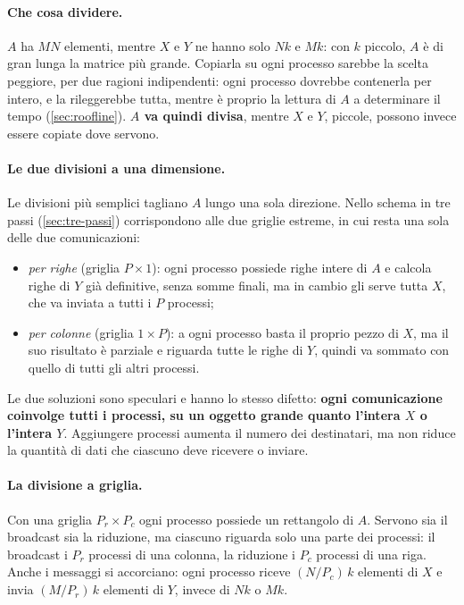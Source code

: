 \documentclass[11pt,a4paper]{article}
\begin{document}
\paragraph{Che cosa dividere.} $A$ ha $MN$ elementi, mentre $X$ e $Y$ ne hanno
solo $Nk$ e $Mk$: con $k$ piccolo, $A$ è di gran lunga la matrice più grande.
Copiarla su ogni processo sarebbe la scelta peggiore, per due ragioni
indipendenti: ogni processo dovrebbe contenerla per intero, e la rileggerebbe
tutta, mentre è proprio la lettura di $A$ a determinare il tempo
(\cref{sec:roofline}). \textbf{$A$ va quindi divisa}, mentre $X$ e $Y$, piccole, possono
invece essere copiate dove servono.

\paragraph{Le due divisioni a una dimensione.} Le divisioni più semplici tagliano
$A$ lungo una sola direzione. Nello schema in tre passi (\cref{sec:tre-passi})
corrispondono alle due griglie estreme, in cui resta una sola delle due
comunicazioni:
\begin{itemize}
  \item \emph{per righe} (griglia $P \times 1$): ogni processo possiede righe
        intere di $A$ e calcola righe di $Y$ già definitive, senza somme finali, ma in cambio gli serve tutta $X$, che va inviata a tutti i $P$
        processi;
  \item \emph{per colonne} (griglia $1 \times P$): a ogni processo basta il
        proprio pezzo di $X$, ma il suo risultato è parziale e riguarda tutte
        le righe di $Y$, quindi va sommato con quello di tutti gli altri
        processi.
\end{itemize}
Le due soluzioni sono speculari e hanno lo stesso difetto: \textbf{ogni
comunicazione coinvolge tutti i processi, su un oggetto grande quanto l'intera
$X$ o l'intera $Y$}. Aggiungere processi aumenta il numero dei destinatari, ma
non riduce la quantità di dati che ciascuno deve ricevere o inviare.

\paragraph{La divisione a griglia.} Con una griglia $P_r \times P_c$ ogni
processo possiede un rettangolo di $A$. Servono sia il broadcast sia la
riduzione, ma ciascuno riguarda solo una parte dei processi: il broadcast i
$P_r$ processi di una colonna, la riduzione i $P_c$ processi di una riga. Anche
i messaggi si accorciano: ogni processo riceve $(N/P_c)\,k$ elementi di $X$ e
invia $(M/P_r)\,k$ elementi di $Y$, invece di $Nk$ o $Mk$.
\end{document}
